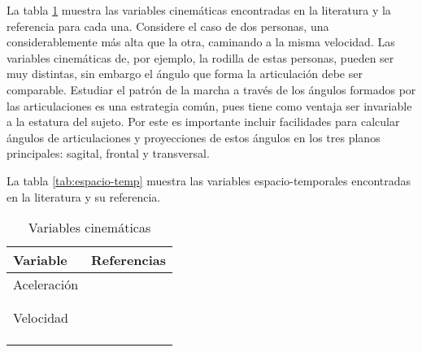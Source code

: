 La tabla \ref{tab:cinematicas} muestra las variables cinemáticas encontradas en la literatura y la referencia para cada una. Considere el caso de dos personas, una considerablemente más alta que la otra, caminando a la misma velocidad. Las variables cinemáticas de, por ejemplo, la rodilla de estas personas, pueden ser muy distintas, sin embargo el ángulo que forma la articulación debe ser comparable. Estudiar el patrón de la marcha a través de los ángulos formados por las articulaciones es una estrategia común, pues tiene como ventaja ser invariable a la estatura del sujeto. Por este es importante incluir facilidades para calcular ángulos de articulaciones y proyecciones de estos ángulos en los tres planos principales: sagital, frontal y transversal.

La tabla \ref{tab:espacio-temp} muestra las variables espacio-temporales encontradas en la literatura y su referencia.

\begin{table}
    \centering
    \caption{Variables cinemáticas}
    \label{tab:cinematicas}
    \begin{tabular}{ll}
        \toprule
        Variable & Referencias \\
        \midrule
        Aceleración & \cite{yang, menz, dejnabadi} \\
                    & \cite{arif, senanayake, latt} \\
                    & \cite{punt, mazza}      \\
        Velocidad   & \cite{yang, menz, cuaya} \\
                    & \cite{franklin, forneris, muro} \\
                    & \cite{lei, prakash, latt} \\
                    & \cite{punt, mazza, bruijn} \\
        \bottomrule
    \end{tabular}
\end{table}

